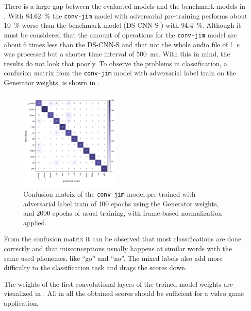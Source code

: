 There is a large gap between the evaluated models and the benchmark models in .
With \SI{84.62}{\percent} the \texttt{conv-jim} model with adversarial pre-training performs about \SI{10}{\percent} worse than the benchmark model (DS-CNN-S \cite{Zhang2017}) with \SI{94.4}{\percent}.
Although it must be considered that the amount of operations for the \texttt{conv-jim} model are about 6 times less than the DS-CNN-S and that not the whole audio file of \SI{1}{\second} was processed but a shorter time interval of \SI{500}{\milli\second}.
With this in mind, the results do not look that poorly.
To observe the problems in classification, a confusion matrix from the \texttt{conv-jim} model with adversarial label train on the Generator weights, is shown in .
\begin{figure}[!ht]
  \centering
  \includegraphics[width=0.45\textwidth]{./5_exp/figs/exp_final_confusion.png}
  \caption{Confusion matrix of the \texttt{conv-jim} model pre-trained with adversarial label train of 100 epochs using the Generator weights, and 2000 epochs of usual training, with frame-based normalization applied.}
  \label{fig:exp_final_confusion}
\end{figure}
\FloatBarrier
\noindent
From the confusion matrix it can be observed that most classifications are done correctly and that misconceptions usually happens at similar words with the same used phonemes, like \enquote{go} and \enquote{no}.
The mixed labels also add more difficulty to the classification task and drags the scores down.

The weights of the first convolutional layers of the trained model weights are visualized in .
All in all the obtained scores should be sufficient for a video game application.